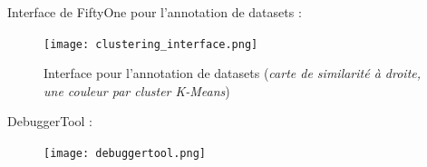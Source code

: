 \begin{landscape}
Interface de FiftyOne pour l'annotation de datasets : \\
    \begin{figure}[H]
        \centering
        \texttt{[image: clustering\_interface.png]}
        \caption{Interface pour l'annotation de datasets (\textit{carte de similarité à droite,
        une couleur par cluster K-Means})}
    \end{figure}\label{clustering_interface}
\end{landscape}

\pagebreak

\begin{landscape}
    DebuggerTool : \\
        \begin{figure}[H]
            \centering
            \texttt{[image: debuggertool.png]}
        \end{figure}\label{debuggertool}
    \end{landscape}
